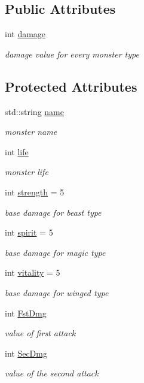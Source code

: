 \subsection*{Public Attributes}
\begin{DoxyCompactItemize}
\item 
int \hyperlink{classMonster_a3819d1bf6ee6bf2a9be94f8ddd2d4cb5}{damage}
\begin{DoxyCompactList}\small\item\em damage value for every monster type \end{DoxyCompactList}\end{DoxyCompactItemize}
\subsection*{Protected Attributes}
\begin{DoxyCompactItemize}
\item 
std\+::string \hyperlink{classMonster_ad32633c349f44cfc07b868ed4c27acde}{name}
\begin{DoxyCompactList}\small\item\em monster name \end{DoxyCompactList}\item 
int \hyperlink{classMonster_aae3dcfdec7021d8982361fefe7ad50e5}{life}
\begin{DoxyCompactList}\small\item\em monster life \end{DoxyCompactList}\item 
int \hyperlink{classMonster_afbc16b4a4bf61323209aea1b5a49e696}{strength} = 5
\begin{DoxyCompactList}\small\item\em base damage for beast type \end{DoxyCompactList}\item 
int \hyperlink{classMonster_aa1b8da71fd1003628cee59bb8f52f270}{spirit} = 5
\begin{DoxyCompactList}\small\item\em base damage for magic type \end{DoxyCompactList}\item 
int \hyperlink{classMonster_a30645db1b638fc2c158720519c0bf645}{vitality} = 5
\begin{DoxyCompactList}\small\item\em base damage for winged type \end{DoxyCompactList}\item 
int \hyperlink{classMonster_aa75316144cd0ca5a4a1d7b76c4931e75}{Fst\+Dmg}
\begin{DoxyCompactList}\small\item\em value of first attack \end{DoxyCompactList}\item 
int \hyperlink{classMonster_abafa6a490f5fd29b3925367c5989b1db}{Sec\+Dmg}
\begin{DoxyCompactList}\small\item\em value of the second attack \end{DoxyCompactList}\end{DoxyCompactItemize}


